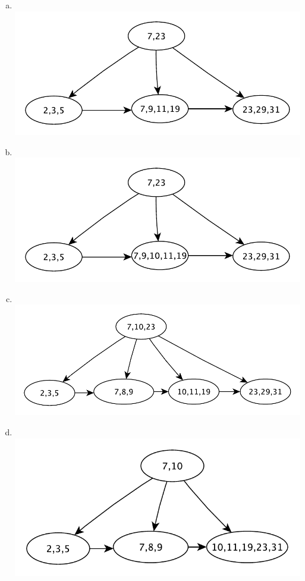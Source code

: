 \documentclass[a4paper,11pt]{article}
\begin{document}
\begin{enumerate}[a.]
    \item ~\\
        \includegraphics[scale=0.7]{2-2-1}
    \item ~\\
        \includegraphics[scale=0.7]{2-2-2}
    \item ~\\
        \includegraphics[scale=0.7]{2-2-3}
    \item ~\\
        \includegraphics[scale=0.7]{2-2-4}

\end{enumerate}
\end{document}
